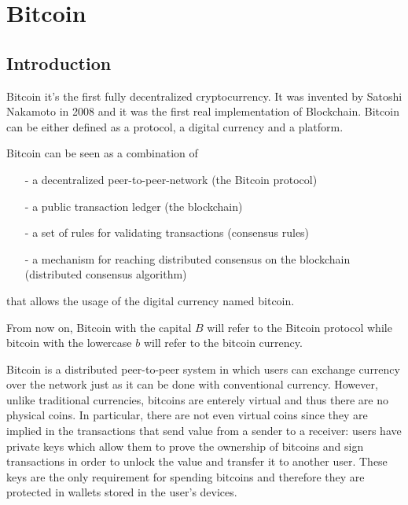 \section{Bitcoin}\label{sec:Bitcoin}
\subsection{Introduction}

Bitcoin it's the first fully decentralized cryptocurrency. It was invented by
Satoshi Nakamoto in 2008 and it was the first real implementation of Blockchain.
Bitcoin can be either defined as a protocol, a digital currency and a platform.

Bitcoin can be seen as a combination of
\vspace{-\topsep}
\begin{itemize}
  \item[-] a decentralized peer-to-peer-network (the Bitcoin protocol)
  \item[-] a public transaction ledger (the blockchain)
  \item[-] a set of rules for validating transactions (consensus rules)
  \item[-] a mechanism for reaching distributed consensus on the blockchain (distributed
  consensus algorithm)
\end{itemize}
\vspace{-\topsep}
that allows the usage of the digital currency named bitcoin.

From now on, Bitcoin with the capital $B$ will refer to the Bitcoin protocol while bitcoin with the lowercase
$b$ will refer to the bitcoin currency.



Bitcoin is a distributed peer-to-peer system in which users can exchange
currency over the network just as it can be done with conventional currency.
However, unlike traditional currencies, bitcoins are enterely virtual and thus
there are no physical coins. In particular, there are not even virtual coins since
they are implied in the transactions that send value from a sender to a receiver:
users have private keys which allow them to prove the ownership of bitcoins and
sign transactions in order to unlock the value and transfer it to another user.
These keys are the only requirement for spending bitcoins and therefore they are
protected in wallets stored in the user's devices.
















